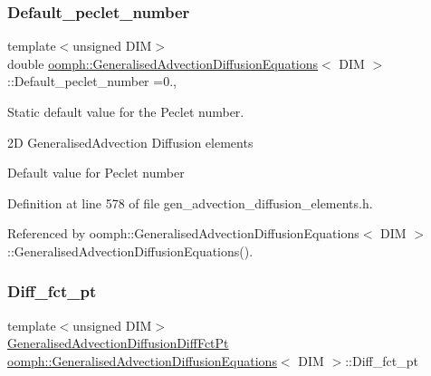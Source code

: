\mbox{\label{classoomph_1_1GeneralisedAdvectionDiffusionEquations_a2d278b9e194799a8b83602c37b61cc23}} 
\subsubsection{\texorpdfstring{Default\+\_\+peclet\+\_\+number}{Default\_peclet\_number}}
{\footnotesize\ttfamily template$<$unsigned D\+IM$>$ \\
double \hyperlink{classoomph_1_1GeneralisedAdvectionDiffusionEquations}{oomph\+::\+Generalised\+Advection\+Diffusion\+Equations}$<$ D\+IM $>$\+::Default\+\_\+peclet\+\_\+number =0.\hspace{0.3cm}{\ttfamily [static]}, {\ttfamily [private]}}



Static default value for the Peclet number. 

2D Generalised\+Advection Diffusion elements

Default value for Peclet number 

Definition at line 578 of file gen\+\_\+advection\+\_\+diffusion\+\_\+elements.\+h.



Referenced by oomph\+::\+Generalised\+Advection\+Diffusion\+Equations$<$ D\+I\+M $>$\+::\+Generalised\+Advection\+Diffusion\+Equations().

\mbox{\label{classoomph_1_1GeneralisedAdvectionDiffusionEquations_a461bd7e2efcdd4620aa94ba70961bcc0}} 
\subsubsection{\texorpdfstring{Diff\+\_\+fct\+\_\+pt}{Diff\_fct\_pt}}
{\footnotesize\ttfamily template$<$unsigned D\+IM$>$ \\
\hyperlink{classoomph_1_1GeneralisedAdvectionDiffusionEquations_a637371a9eebc399023c6a652e8219263}{Generalised\+Advection\+Diffusion\+Diff\+Fct\+Pt} \hyperlink{classoomph_1_1GeneralisedAdvectionDiffusionEquations}{oomph\+::\+Generalised\+Advection\+Diffusion\+Equations}$<$ D\+IM $>$\+::Diff\+\_\+fct\+\_\+pt\hspace{0.3cm}{\ttfamily [protected]}}




